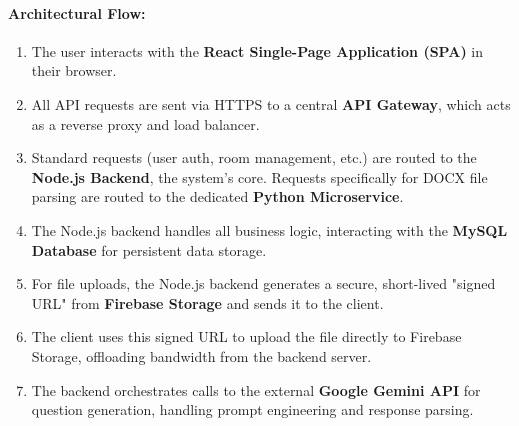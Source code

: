 \paragraph{Architectural Flow:}
\begin{enumerate}
    \item The user interacts with the \textbf{React Single-Page Application (SPA)} in their browser.
    \item All API requests are sent via HTTPS to a central \textbf{API Gateway}, which acts as a reverse proxy and load balancer.
    \item Standard requests (user auth, room management, etc.) are routed to the \textbf{Node.js Backend}, the system's core. Requests specifically for DOCX file parsing are routed to the dedicated \textbf{Python Microservice}.
    \item The Node.js backend handles all business logic, interacting with the \textbf{MySQL Database} for persistent data storage.
    \item For file uploads, the Node.js backend generates a secure, short-lived "signed URL" from \textbf{Firebase Storage} and sends it to the client.
    \item The client uses this signed URL to upload the file directly to Firebase Storage, offloading bandwidth from the backend server.
    \item The backend orchestrates calls to the external \textbf{Google Gemini API} for question generation, handling prompt engineering and response parsing.
\end{enumerate}

